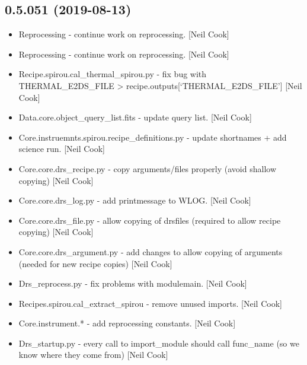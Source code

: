 \documentclass[a4paper,10pt,english]{report}
\begin{document}
\subsection{0.5.051 (2019-08-13)}
\label{\detokenize{misc/changelog:id90}}\begin{itemize}
\item {} 
Reprocessing - continue work on reprocessing. {[}Neil Cook{]}

\item {} 
Reprocessing - continue work on reprocessing. {[}Neil Cook{]}

\item {} 
Recipe.spirou.cal\_thermal\_spirou.py - fix bug with THERMAL\_E2DS\_FILE
\textendash{}\textgreater{} recipe.outputs{[}‘THERMAL\_E2DS\_FILE’{]} {[}Neil Cook{]}

\item {} 
Data.core.object\_query\_list.fits - update query list. {[}Neil Cook{]}

\item {} 
Core.instruemnts.spirou.recipe\_definitions.py - update shortnames +
add science run. {[}Neil Cook{]}

\item {} 
Core.core.drs\_recipe.py - copy arguments/files properly (avoid shallow
copying) {[}Neil Cook{]}

\item {} 
Core.core.drs\_log.py - add printmessage to WLOG. {[}Neil Cook{]}

\item {} 
Core.core.drs\_file.py - allow copying of drsfiles (required to allow
recipe copying) {[}Neil Cook{]}

\item {} 
Core.core.drs\_argument.py - add changes to allow copying of arguments
(needed for new recipe copies) {[}Neil Cook{]}

\item {} 
Drs\_reprocess.py - fix problems with modulemain. {[}Neil Cook{]}

\item {} 
Recipes.spirou.cal\_extract\_spirou - remove unused imports. {[}Neil Cook{]}

\item {} 
Core.instrument.* - add reprocessing constants. {[}Neil Cook{]}

\item {} 
Drs\_startup.py - every call to import\_module should call func\_name (so
we know where they come from) {[}Neil Cook{]}


\end{itemize}
\end{document}
